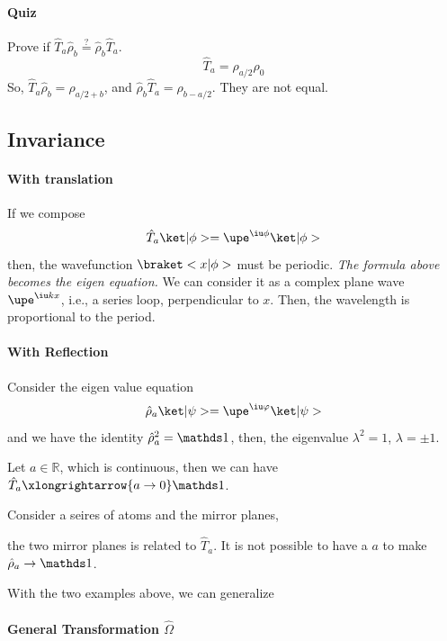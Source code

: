 \paragraph{Quiz}
Prove if $\hat T_a \hat \rho_b \overset?= \hat\rho_b\hat T_a$.
\[
  \hat T_a = \rho_{a/2} \rho_0
\]
So, $\hat T_a \hat \rho_b = \rho_{a/2+b}$, and
$\hat\rho_b\hat T_a = \rho_{b-a/2}$. They are not equal.

\subsection{Invariance}

\paragraph{With translation}

If we compose
\[
  \hat T_a \ket|\phi> = \upe^{\iu\phi} \ket|\phi>
\]
then, the wavefunction $\braket<x|\phi>$ must be periodic.
\emph{The formula above becomes the eigen equation.}
We can consider it as a complex plane wave $\upe^{\iu kx}$, i.e.,
a series loop, perpendicular to $x$.
Then, the wavelength is proportional to the period.

\paragraph{With Reflection}

Consider the eigen value equation
\[
  \hat\rho_a \ket|\psi> = \upe^{\iu\varphi} \ket|\psi>
\]
and we have the identity $\hat\rho_a^2 = \identity$,
then, the eigenvalue $\lambda^2 = 1$, $\lambda = \pm 1$.

Let $a \in \mathbb R$, which is continuous,
then we can have $\hat T_a \xlongrightarrow{a\to0} \identity$.

Consider a seires of atoms and the mirror planes,
\begin{center}
\end{center}
the two mirror planes is related to $\hat T_a$.
It is not possible to have a $a$ to make $\hat \rho_a \to \identity$.

With the two examples above, we can generalize
\paragraph{General Transformation $\hat\Omega$}

